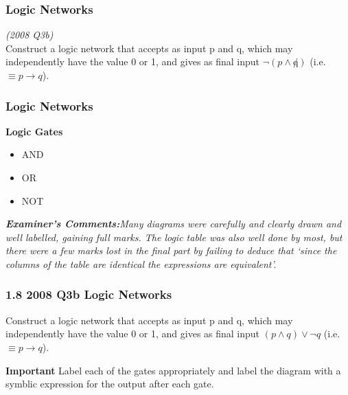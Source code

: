 \documentclass{beamer}
\begin{document}
\begin{frame}
\Large
\frametitle{Logic Networks }
\emph{(2008 Q3b)}\\
Construct a logic network that accepts as input p and q, which may independently have the value 0 or 1, and
gives as final input $\neg(p \wedge \not q)$ (i.e. $\equiv p \rightarrow q$).\\
\end{frame}
\begin{frame}
\Large
\frametitle{Logic Networks }

\textbf{Logic Gates}
\begin{itemize}
\item AND
\item OR
\item NOT
\end{itemize}
\end{frame}
\begin{frame}

\emph{\textbf{Examiner's Comments:}Many
diagrams were carefully and clearly drawn and well labelled, gaining full
marks. The logic table was also well done by most, but there were a few marks
lost in the final part by failing to deduce that ‘since the columns of the table are
identical the expressions are equivalent’.}
\end{frame}
\begin{frame}
\frametitle{1.8 2008 Q3b Logic Networks }
Construct a logic network that accepts as input p and q, which may independently have the value 0 or 1, and
gives as final input $(p \wedge  q) \vee \neg q$ (i.e. $\equiv p \rightarrow q$).



\textbf{Important} Label each of the gates appropriately and label the diagram with a symblic expression for the output after each gate.

\end{frame}
\end{document}
